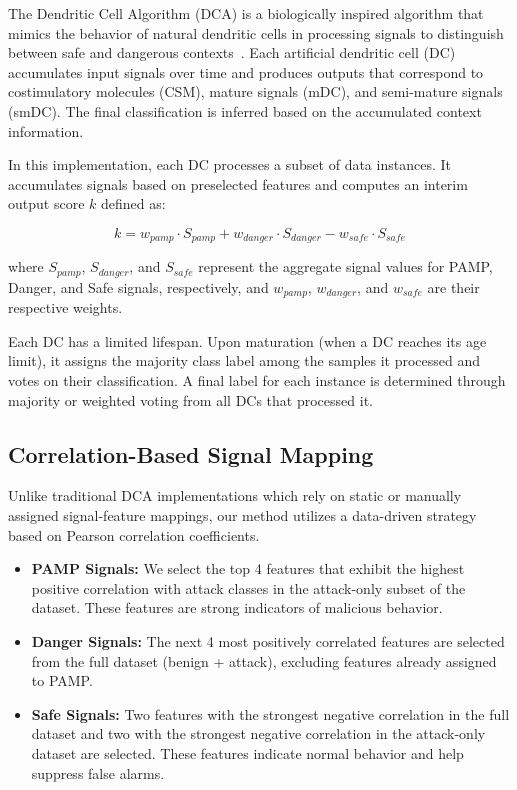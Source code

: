 \documentclass[conference]{IEEEtran}
\begin{document}
The Dendritic Cell Algorithm (DCA) is a biologically inspired
algorithm that mimics the behavior of natural dendritic cells in
processing signals to distinguish between safe and dangerous
contexts~\cite{greensmith_dca_2008}. Each artificial dendritic cell (DC) accumulates input
signals over time and produces outputs that correspond to
costimulatory molecules (CSM), mature signals (mDC), and semi-mature
signals (smDC). The final classification is inferred based on the
accumulated context information.

In this implementation, each DC processes a subset of data instances.
It accumulates signals based on preselected features and computes an
interim output score $k$ defined as:

\begin{equation}
  k = w_{pamp} \cdot S_{pamp} + w_{danger} \cdot S_{danger} -
  w_{safe} \cdot S_{safe}
\end{equation}

where $S_{pamp}$, $S_{danger}$, and $S_{safe}$ represent the
aggregate signal values for PAMP, Danger, and Safe signals,
respectively, and $w_{pamp}$, $w_{danger}$, and $w_{safe}$ are their
respective weights.

Each DC has a limited lifespan. Upon maturation (when a DC reaches
its age limit), it assigns the majority class label among the samples
it processed and votes on their classification. A final label for
each instance is determined through majority or weighted voting from
all DCs that processed it.

\subsection{Correlation-Based Signal Mapping}

Unlike traditional DCA implementations which rely on static or
manually assigned signal-feature mappings, our method utilizes a
data-driven strategy based on Pearson correlation coefficients.

\begin{itemize}
  \item \textbf{PAMP Signals:} We select the top 4 features that
    exhibit the highest positive correlation with attack classes in
    the attack-only subset of the dataset. These features are strong
    indicators of malicious behavior.

  \item \textbf{Danger Signals:} The next 4 most positively
    correlated features are selected from the full dataset (benign +
    attack), excluding features already assigned to PAMP.

  \item \textbf{Safe Signals:} Two features with the strongest
    negative correlation in the full dataset and two with the
    strongest negative correlation in the attack-only dataset are
    selected. These features indicate normal behavior and help
    suppress false alarms.
\end{itemize}
\end{document}
